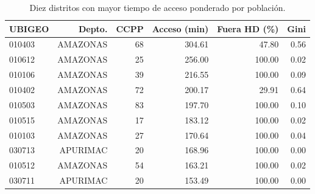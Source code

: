 \begin{table}[htbp]\centering
\caption{Diez distritos con mayor tiempo de acceso ponderado por población.}\label{tab:peores}
\begin{tabular}{lrrrrr}
\toprule
UBIGEO & Depto. & CCPP & Acceso (min) & Fuera HD (\%) & Gini \\
\midrule
010403 & AMAZONAS & 68 & 304.61 & 47.80 & 0.56 \\
010612 & AMAZONAS & 25 & 256.00 & 100.00 & 0.02 \\
010106 & AMAZONAS & 39 & 216.55 & 100.00 & 0.09 \\
010402 & AMAZONAS & 72 & 200.17 & 29.91 & 0.64 \\
010503 & AMAZONAS & 83 & 197.70 & 100.00 & 0.10 \\
010515 & AMAZONAS & 17 & 183.12 & 100.00 & 0.02 \\
010103 & AMAZONAS & 27 & 170.64 & 100.00 & 0.04 \\
030713 & APURIMAC & 20 & 168.96 & 100.00 & 0.00 \\
010512 & AMAZONAS & 54 & 163.21 & 100.00 & 0.02 \\
030711 & APURIMAC & 20 & 153.49 & 100.00 & 0.00 \\
\bottomrule
\end{tabular}
\end{table}
